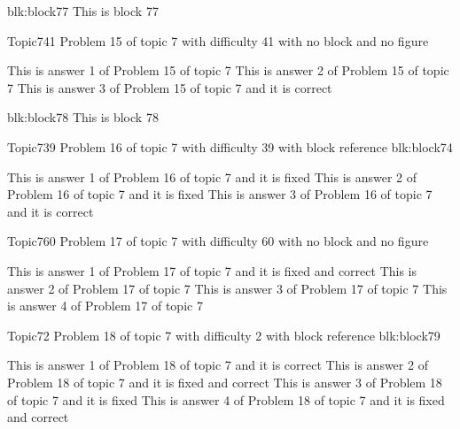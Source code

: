 \documentclass[master]{exam}
\begin{document}
\begin{block}{blk:block77}
This is block 77
\end{block}


\begin{problem}{Topic7}{41}
	Problem 15 of topic 7 with difficulty 41 with no block and no figure
	\begin{answers}
		\answer This is answer 1 of Problem 15 of topic 7 
		\answer This is answer 2 of Problem 15 of topic 7 
		\answer[correct] This is answer 3 of Problem 15 of topic 7 and it is correct
	\end{answers}
\end{problem}



\begin{block}{blk:block78}
This is block 78
\end{block}


\begin{problem}[requires=blk:block74]{Topic7}{39}
	Problem 16 of topic 7 with difficulty 39 with block reference blk:block74
	\begin{answers}
		\answer[fixed] This is answer 1 of Problem 16 of topic 7 and it is fixed
		\answer[fixed] This is answer 2 of Problem 16 of topic 7 and it is fixed
		\answer[correct] This is answer 3 of Problem 16 of topic 7 and it is correct
	\end{answers}
\end{problem}

\begin{problem}{Topic7}{60}
	Problem 17 of topic 7 with difficulty 60 with no block and no figure
	\begin{answers}
		 This is answer 1 of Problem 17 of topic 7 and it is fixed and correct
		\answer This is answer 2 of Problem 17 of topic 7 
		\answer This is answer 3 of Problem 17 of topic 7 
		\answer This is answer 4 of Problem 17 of topic 7 
	\end{answers}
\end{problem}

\begin{problem}[requires=blk:block79]{Topic7}{2}
	Problem 18 of topic 7 with difficulty 2 with block reference blk:block79
	\begin{answers}
		\answer[correct] This is answer 1 of Problem 18 of topic 7 and it is correct
		 This is answer 2 of Problem 18 of topic 7 and it is fixed and correct
		\answer[fixed] This is answer 3 of Problem 18 of topic 7 and it is fixed
		 This is answer 4 of Problem 18 of topic 7 and it is fixed and correct
	\end{answers}
\end{problem}
\end{document}
